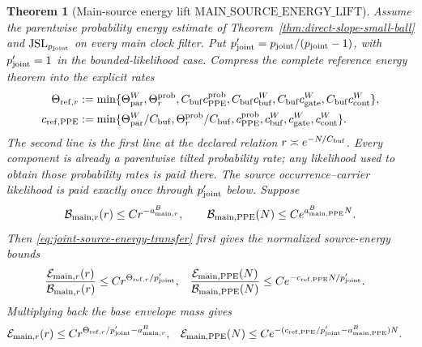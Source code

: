 \documentclass[11pt]{article}
\newtheorem{theorem}{Theorem}[section]
\begin{document}
\begin{theorem}[Main-source energy lift
$\mathrm{MAIN\_SOURCE\_ENERGY\_LIFT}$]
\label{thm:main-source-energy-lift}
Assume the parentwise probability energy estimate of
Theorem~\ref{thm:direct-slope-small-ball} and
$\mathrm{JSL}_{p_{\rm joint}}$ on every main clock filter.  Put
$p_{\rm joint}'=p_{\rm joint}/(p_{\rm joint}-1)$, with
$p_{\rm joint}'=1$ in the bounded-likelihood case.  Compress the complete
reference energy theorem into the explicit rates
\begin{align}
 \Theta_{{\rm ref},r}:=\min\{&\Theta_{\rm par}^{W},
  \Theta_r^{\rm prob},C_{\rm buf}c_{\rm PPE}^{\rm prob},
  C_{\rm buf}c_{\rm buf}^{W},C_{\rm buf}c_{\rm gate}^{W},
  C_{\rm buf}c_{\rm cont}^{W}\},\notag\\
 c_{{\rm ref},{\rm PPE}}:=\min\{&\Theta_{\rm par}^{W}/C_{\rm buf},
  \Theta_r^{\rm prob}/C_{\rm buf},c_{\rm PPE}^{\rm prob},
  c_{\rm buf}^{W},c_{\rm gate}^{W},c_{\rm cont}^{W}\}.
 \label{eq:explicit-reference-energy-rates}
\end{align}
The second line is the first line at the declared relation
$r\asymp e^{-N/C_{\rm buf}}$.  Every component is already a parentwise
tilted probability rate; any likelihood used to obtain those probability
rates is paid there.  The source occurrence--carrier likelihood is paid
exactly once through $p_{\rm joint}'$ below.
Suppose
\begin{equation}
\label{eq:main-source-base-mass}
 \mathcal B_{{\rm main},r}(r)\le Cr^{-a_{{\rm main},r}^{B}},
 \qquad
 \mathcal B_{{\rm main},{\rm PPE}}(N)
 \le Ce^{a_{{\rm main},{\rm PPE}}^{B}N}.
\end{equation}
Then \eqref{eq:joint-source-energy-transfer} first gives the normalized
source-energy bounds
\begin{align}
 \frac{\mathcal E_{{\rm main},r}(r)}
      {\mathcal B_{{\rm main},r}(r)}
 &\le Cr^{\Theta_{{\rm ref},r}/p_{\rm joint}'},&
 \frac{\mathcal E_{{\rm main},{\rm PPE}}(N)}
      {\mathcal B_{{\rm main},{\rm PPE}}(N)}
 &\le Ce^{-c_{{\rm ref},{\rm PPE}}N/p_{\rm joint}'}.
 \label{eq:normalized-joint-source-energy}
\end{align}
Multiplying back the base envelope mass gives
\begin{align}
 \mathcal E_{{\rm main},r}(r)&\le
 Cr^{\Theta_{{\rm ref},r}/p_{\rm joint}'-a_{{\rm main},r}^{B}},
 &
 \mathcal E_{{\rm main},{\rm PPE}}(N)&\le
 Ce^{-(c_{{\rm ref},{\rm PPE}}/p_{\rm joint}'
       -a_{{\rm main},{\rm PPE}}^{B})N}.
 \label{eq:source-energy-bound}
\end{align}

\end{theorem}
\end{document}
